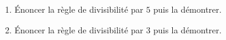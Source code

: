 \documentclass[a4paper,12pt]{article}
\begin{document}
%    
%    
%    
%    
%    
%    
%    
%    
%    
%    
%    
%    
%    
%    
%    
%    
%    
%    
%
%
\begin{exercice}[title=Exercice 26 $\quad \star \star \quad$ { [Communiquer, Raisonner]}]{}{}
\begin{enumerate}
    \item Énoncer la règle de divisibilité par $5$ puis la démontrer.
    \item Énoncer la règle de divisibilité par $3$ puis la démontrer.
\end{enumerate}
\end{exercice}
\end{document}
